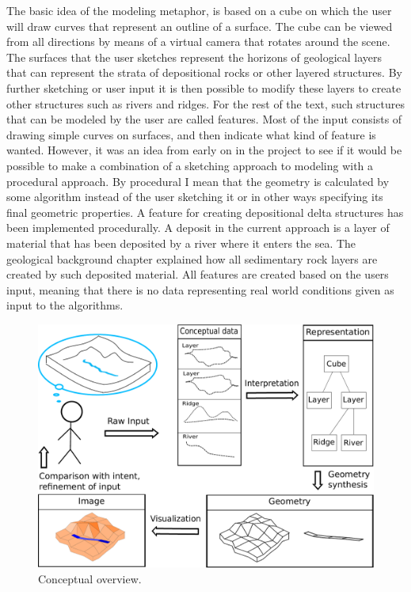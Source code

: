 \documentclass[a4paper,12pt]{report}
\begin{document}
The basic idea of the modeling metaphor, is based on a cube on which the user will draw curves that represent an outline of a surface. The cube can be viewed from all directions by means of a virtual camera that rotates around the scene. The surfaces that the user sketches represent the horizons of geological layers that can represent the strata of depositional rocks or other layered structures. By further sketching or user input it is then possible to modify these layers to create other structures such as rivers and ridges. For the rest of the text, such structures that can be modeled by the user are called features. Most of the input consists of drawing simple curves on surfaces, and then indicate what kind of feature is wanted. However, it was an idea from early on in the project to see if it would be possible to make a combination of a sketching approach to modeling with a procedural approach. By procedural I mean that the geometry is calculated by some algorithm instead of the user sketching it or in 
other ways specifying its final 
geometric properties. A feature for creating depositional delta structures has been implemented procedurally. A deposit in the current approach is a layer of material that has been deposited by a river where it enters the sea. The geological background chapter explained how all sedimentary rock layers are created by such deposited material. All features are created based on the users input, meaning that there is no data representing real world conditions given as input to the algorithms.
\begin{figure}[t]
 \includegraphics[width=\linewidth]{thesis/overviewConcept.pdf}
 \caption{Conceptual overview.}
 \label{fig:overviewConcept}
\end{figure}
\end{document}

